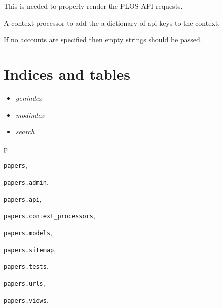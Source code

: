 \documentclass[letterpaper,10pt,english]{sphinxmanual}
\begin{document}
This is needed to properly render the PLOS API requests.

\begin{fulllineitems}
\label{papers:papers.context_processors.api_keys}
A context processor to add the a dictionary of api keys to the context.

If no accounts are specified then empty strings should be passed.

\end{fulllineitems}



\chapter{Indices and tables}
\label{index:indices-and-tables}\begin{itemize}
\item {} 
\emph{genindex}

\item {} 
\emph{modindex}

\item {} 
\emph{search}

\end{itemize}


\renewcommand{\indexname}{Python Module Index}
\begin{theindex}
\def\bigletter#1{{\Large\sffamily#1}\nopagebreak\vspace{1mm}}
\bigletter{p}
\item {\texttt{papers}}, \pageref{papers:module-papers}
\item {\texttt{papers.admin}}, \pageref{papers:module-papers.admin}
\item {\texttt{papers.api}}, \pageref{papers:module-papers.api}
\item {\texttt{papers.context\_processors}}, \pageref{papers:module-papers.context_processors}
\item {\texttt{papers.models}}, \pageref{papers:module-papers.models}
\item {\texttt{papers.sitemap}}, \pageref{papers:module-papers.sitemap}
\item {\texttt{papers.tests}}, \pageref{papers:module-papers.tests}
\item {\texttt{papers.urls}}, \pageref{papers:module-papers.urls}
\item {\texttt{papers.views}}, \pageref{papers:module-papers.views}
\end{theindex}

\renewcommand{\indexname}{Index}
\printindex
\end{document}
